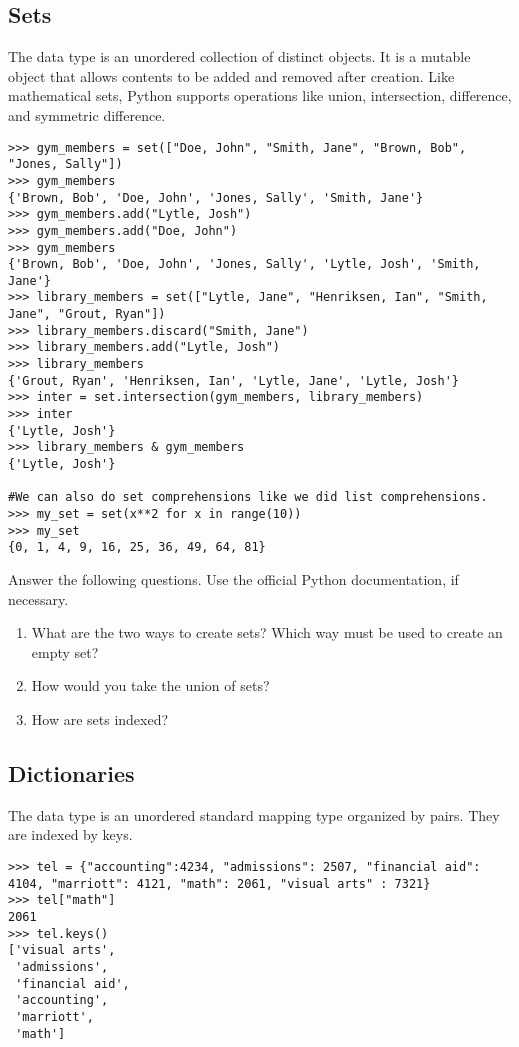 \subsection*{Sets}
\begin{example}

The  data type is an unordered collection of distinct objects.
It is a mutable object that allows contents to be added and removed after creation. 
Like mathematical sets, Python supports operations like union, intersection, 
difference, and symmetric difference. 

\begin{lstlisting}
>>> gym_members = set(["Doe, John", "Smith, Jane", "Brown, Bob", "Jones, Sally"])
>>> gym_members
{'Brown, Bob', 'Doe, John', 'Jones, Sally', 'Smith, Jane'}
>>> gym_members.add("Lytle, Josh")
>>> gym_members.add("Doe, John")
>>> gym_members
{'Brown, Bob', 'Doe, John', 'Jones, Sally', 'Lytle, Josh', 'Smith, Jane'}
>>> library_members = set(["Lytle, Jane", "Henriksen, Ian", "Smith, Jane", "Grout, Ryan"])
>>> library_members.discard("Smith, Jane")
>>> library_members.add("Lytle, Josh") 
>>> library_members
{'Grout, Ryan', 'Henriksen, Ian', 'Lytle, Jane', 'Lytle, Josh'}
>>> inter = set.intersection(gym_members, library_members)
>>> inter
{'Lytle, Josh'}
>>> library_members & gym_members
{'Lytle, Josh'}

#We can also do set comprehensions like we did list comprehensions.
>>> my_set = set(x**2 for x in range(10))
>>> my_set
{0, 1, 4, 9, 16, 25, 36, 49, 64, 81}
\end{lstlisting}
\end{example}

\begin{problem}
Answer the following questions. Use the official Python documentation, if necessary.
\begin{enumerate}
\item What are the two ways to create sets? Which way must be used to 
create an empty set?
\item How would you take the union of sets?
\item How are sets indexed?

\end{enumerate}
\end{problem}

\subsection*{Dictionaries}
\begin{example}

The  data type is an unordered standard mapping type 
organized by  pairs. They are indexed by keys. 

\begin{lstlisting}
>>> tel = {"accounting":4234, "admissions": 2507, "financial aid": 4104, "marriott": 4121, "math": 2061, "visual arts" : 7321} 
>>> tel["math"]
2061
>>> tel.keys()
['visual arts',
 'admissions',
 'financial aid',
 'accounting',
 'marriott',
 'math'] 
\end{lstlisting}
\end{example}

